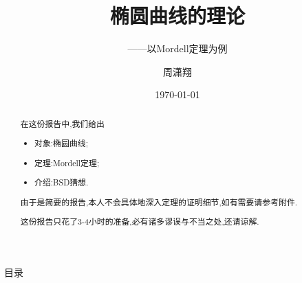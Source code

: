 \documentclass[pdf]{beamer}
\title{椭圆曲线的理论}
\subtitle{\hspace{5cm}——以Mordell定理为例}
\author{周潇翔}
\institute[USTC]{University of Science and Technology of China}
\date{\today}
\numberwithin{equation}{section}
\theoremstyle{plain}
\theoremstyle{plain}
\theoremstyle{plain}
\theoremstyle{remark}
\begin{document}
	\begin{frame}
	\titlepage
\end{frame}
\begin{frame}
\begin{abstract}
	\hspace*{20pt}在这份报告中,我们给出
	\begin{itemize}
		\item 对象:椭圆曲线;
		\item 定理:Mordell定理;
		\item 介绍:BSD猜想.
	\end{itemize}
\hspace*{20pt}由于是简要的报告,本人不会具体地深入定理的证明细节,如有需要请参考附件.

\hspace*{20pt}这份报告只花了3-4小时的准备,必有诸多谬误与不当之处,还请谅解.
\end{abstract}

\end{frame}

\begin{frame}{目录}
\tableofcontents
\end{frame}
\end{document}
